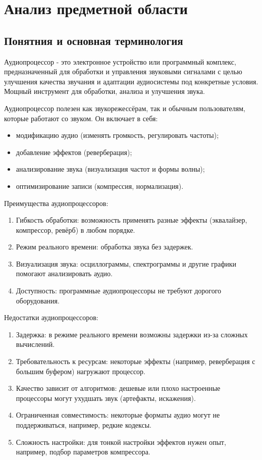 \section{Анализ предметной области}
\subsection{Понятния и основная терминология}

Аудиопроцессор - это электронное устройство или программный комплекс, предназначенный для обработки и управления звуковыми сигналами с целью улучшения качества звучания и адаптации аудиосистемы под конкретные условия. Мощный инструмент для обработки, анализа и улучшения звука. 

Аудиопроцессор полезен как звукорежессёрам, так и обычным пользователям, которые работают со звуком. Он включает в себя:
\begin{itemize}
	\item модификацию аудио (изменять громкость, регулировать частоты);
	\item добавление эффектов (реверберация);
	\item анализирование звука (визуализация частот и формы волны);
	\item оптимизирование записи (компрессия, нормализация).
\end{itemize}

Преимущества аудиопроцессоров:
\begin{enumerate}
	\item Гибкость обработки: возможность применять разные эффекты (эквалайзер, компрессор, ревёрб) в любом порядке.
	\item Режим реального времени: обработка звука без задержек.
	\item Визуализация звука: осциллограммы, спектрограммы и другие графики помогают анализировать аудио.
	\item Доступность: программные аудиопроцессоры не требуют дорогого оборудования.
\end{enumerate}

Недостатки аудиопроцессоров:
\begin{enumerate}
	\item Задержка: в режиме реального времени возможны задержки из-за сложных вычислений.
	\item Требовательность к ресурсам: некоторые эффекты (например, реверберация с большим буфером) нагружают процессор.
	\item Качество зависит от алгоритмов: дешевые или плохо настроенные процессоры могут ухудшать звук (артефакты, искажения).
	\item Ограниченная совместимость: некоторые форматы аудио могут не поддерживаться, например, редкие кодексы.
	\item Сложность настройки: для тонкой настройки эффектов нужен опыт, например, подбор параметров компрессора.
\end{enumerate}
